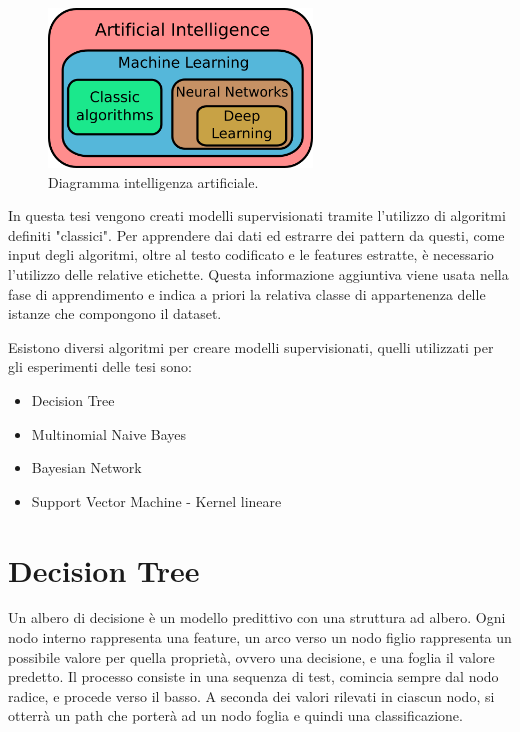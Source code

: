 \documentclass[oneside]{book}
\begin{document}
\begin{figure}[H]
	\centering
	\includegraphics[width=7cm]{assets/ai_diagram.png}
	\caption[Caption for LOF]{Diagramma intelligenza artificiale.\footnotemark}
	\label{fig:artificial-intelligence}
\end{figure}


In questa tesi vengono creati modelli supervisionati tramite l'utilizzo di algoritmi definiti "classici". Per apprendere dai dati ed estrarre dei pattern da questi, come input degli algoritmi, oltre al testo codificato e le features estratte, è necessario l'utilizzo delle relative etichette. Questa informazione aggiuntiva viene usata nella fase di apprendimento e indica a priori la relativa classe di appartenenza delle istanze che compongono il dataset. 

Esistono diversi algoritmi per creare modelli supervisionati, quelli utilizzati per gli esperimenti delle tesi sono:
\begin{itemize}
	\item Decision Tree
	\item Multinomial Naive Bayes
	\item Bayesian Network
	\item Support Vector Machine - Kernel lineare
\end{itemize}

\section{Decision Tree}
Un albero di decisione è un modello predittivo con una struttura ad albero. Ogni nodo interno rappresenta una feature, un arco verso un nodo figlio rappresenta un possibile valore per quella proprietà, ovvero una decisione, e una foglia il valore predetto. Il processo consiste in una sequenza di test, comincia sempre dal nodo radice, e procede verso il basso. A seconda dei valori rilevati in ciascun nodo, si otterrà un path che porterà ad un nodo foglia e quindi una classificazione.
\end{document}
